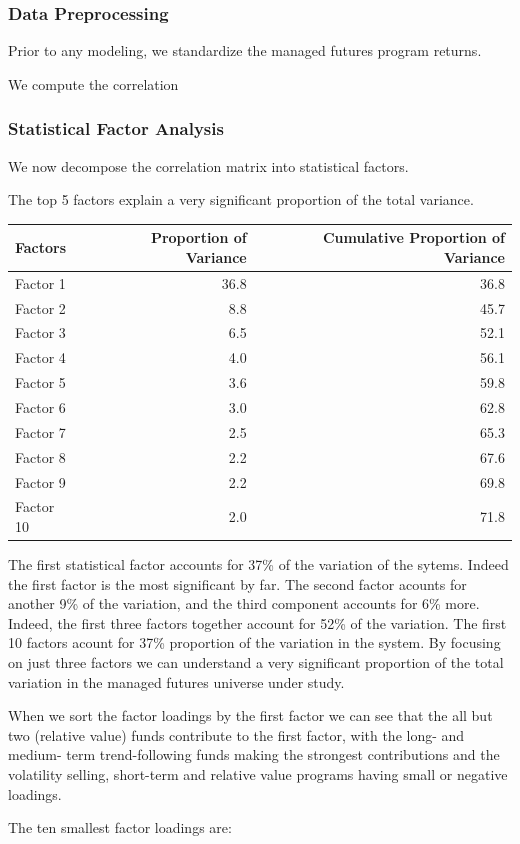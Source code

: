 \documentclass[]{article}
\begin{document}
\subsubsection{Data Preprocessing}\label{data-preprocessing}

Prior to any modeling, we standardize the managed futures program
returns.

We compute the correlation

\subsubsection{Statistical Factor
Analysis}\label{statistical-factor-analysis}

We now decompose the correlation matrix into statistical factors.

The top 5 factors explain a very significant proportion of the total
variance.

\begin{longtable}[c]{@{}lrr@{}}
\toprule
Factors & Proportion of Variance & Cumulative Proportion of
Variance\tabularnewline
\midrule
\endhead
Factor 1 & 36.8 & 36.8\tabularnewline
Factor 2 & 8.8 & 45.7\tabularnewline
Factor 3 & 6.5 & 52.1\tabularnewline
Factor 4 & 4.0 & 56.1\tabularnewline
Factor 5 & 3.6 & 59.8\tabularnewline
Factor 6 & 3.0 & 62.8\tabularnewline
Factor 7 & 2.5 & 65.3\tabularnewline
Factor 8 & 2.2 & 67.6\tabularnewline
Factor 9 & 2.2 & 69.8\tabularnewline
Factor 10 & 2.0 & 71.8\tabularnewline
\bottomrule
\end{longtable}

The first statistical factor accounts for 37\% of the variation of the
sytems. Indeed the first factor is the most significant by far. The
second factor acounts for another 9\% of the variation, and the third
component accounts for 6\% more. Indeed, the first three factors
together account for 52\% of the variation. The first 10 factors acount
for 37\% proportion of the variation in the system. By focusing on just
three factors we can understand a very significant proportion of the
total variation in the managed futures universe under study.

When we sort the factor loadings by the first factor we can see that the
all but two (relative value) funds contribute to the first factor, with
the long- and medium- term trend-following funds making the strongest
contributions and the volatility selling, short-term and relative value
programs having small or negative loadings.

The ten smallest factor loadings are:
\end{document}
